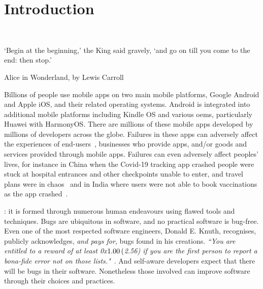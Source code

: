 \setchapterpreamble[u]{\margintoc} %
\chapter{Introduction}~\label{chapter-introduction}

\epigraph{`Begin at the beginning,' the King said gravely, `and go on till you come to the end: then stop.'}{Alice in Wonderland, by Lewis Carroll}

\bigskip


Billions of people use mobile apps on two main mobile platforms, Google Android and Apple iOS, and their related operating systems.  Android is integrated into additional mobile platforms including Kindle OS and various \glspl{oem}, particularly Huawei with HarmonyOS. There are millions of these mobile apps developed by millions of developers across the globe. Failures in these apps can adversely affect the experiences of end-users~, businesses who provide apps, and/or goods and services provided through mobile apps. Failures can even adversely affect peoples' lives, for instance in China when the Covid-19 tracking app crashed people were stuck at hospital entrances and other checkpoints unable to enter, and travel plans were in chaos~ and in India where users were not able to book vaccinations as the app crashed~.

: it is formed through numerous human endeavours using flawed tools and techniques.
Bugs are ubiquitous in software, and no practical software is bug-free. Even one of the most respected software engineers, Donald E. Knuth, recognises, publicly acknowledges, \emph{and pays for}, bugs found in his creations. %
\emph{``You are entitled to a reward of at least 0x$1.00 \nobreak\hspace{.16667em plus .08333em} ($2.56) if you are the first person to report a \textit{bona-fide} error not on those lists."}~. And self-aware developers expect that there will be bugs in their software. Nonetheless those involved can improve software through their choices and practices.

